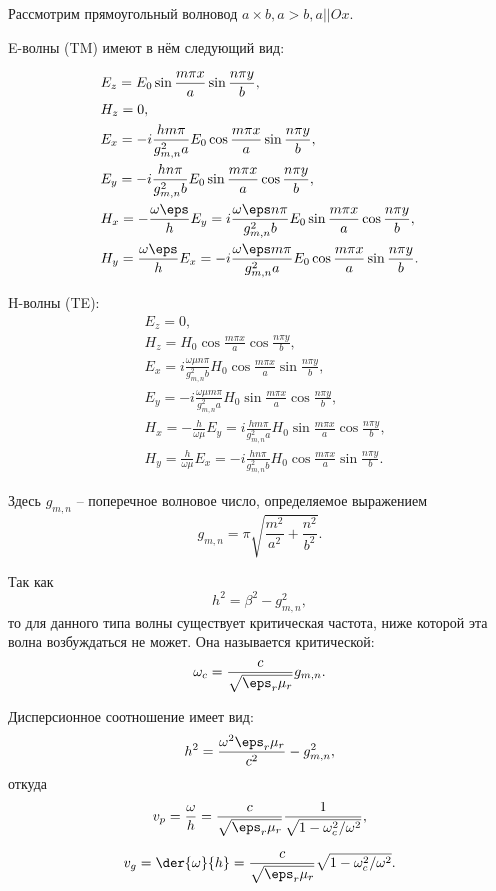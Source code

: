 Рассмотрим прямоугольный волновод \( a \times b, a > b, a || Ox \).

E-волны (TM) имеют в нём следующий вид:

\begin{align*}
	& E_z = E_0\sin\frac{m\pi x}{a}\sin\frac{n\pi y}{b},\\
	& H_z = 0,\\
	& E_x = -i\frac{hm\pi}{g_{m,n}^2a}E_0\cos\frac{m\pi x}{a}\sin\frac{n\pi y}{b},\\
	& E_y = -i\frac{hn\pi}{g_{m,n}^2b}E_0\sin\frac{m\pi x}{a}\cos\frac{n\pi y}{b},\\
	& H_x = -\frac{\omega\eps}{h}E_y = i\frac{\omega\eps n\pi}{g_{m,n}^2b}E_0
	 								\sin\frac{m\pi x}{a}\cos\frac{n\pi y}{b},\\
	& H_y = \frac{\omega\eps}{h}E_x = -i\frac{\omega\eps m\pi}{g_{m,n}^2a}E_0
	 								\cos\frac{m\pi x}{a}\sin\frac{n\pi y}{b}.
\end{align*}

H-волны (TE):
\begin{align*}
	& E_z = 0,\\
	& H_z = H_0\cos\frac{m\pi x}{a}\cos\frac{n\pi y}{b},\\
	& E_x = i\frac{\omega\mu n\pi}{g_{m,n}^2b}H_0\cos\frac{m\pi x}{a}\sin\frac{n\pi y}{b},\\
	& E_y = -i\frac{\omega\mu m\pi}{g_{m,n}^2a}H_0\sin\frac{m\pi x}{a}\cos\frac{n\pi y}{b},\\
	& H_x = -\frac{h}{\omega\mu}E_y = i\frac{hm\pi}{g_{m,n}^2a}H_0
	 								\sin\frac{m\pi x}{a}\cos\frac{n\pi y}{b},\\
	& H_y = \frac{h}{\omega\mu}E_x = -i\frac{h n\pi}{g_{m,n}^2b}H_0
	 								\cos\frac{m\pi x}{a}\sin\frac{n\pi y}{b}.
\end{align*}

Здесь \( g_{m,n} \) -- поперечное волновое число, определяемое выражением
\[
	g_{m,n} = \pi\sqrt{\frac{m^2}{a^2} + \frac{n^2}{b^2}}.
\]

Так как
\[
	h^2 = \beta^2 - g_{m,n}^2,
\]
то для данного типа волны существует критическая частота, ниже которой эта волна возбуждаться не может. Она называется критической:
\[
	\omega_c = \frac{c}{\sqrt{\eps_r \mu_r}}g_{m,n}.
\]

Дисперсионное соотношение имеет вид:
\[
	h^2 = \frac{\omega^2 \eps_r \mu_r}{c^2} - g_{m,n}^2,
\]
откуда
\[
	v_p = \frac{\omega}{h} = \frac{c}{\sqrt{\eps_r\mu_r}}\frac{1}{\sqrt{1 - \omega_c^2 / \omega^2}},
\]

\[
	v_g = \der{\omega}{h} = \frac{c}{\sqrt{\eps_r\mu_r}}\sqrt{1 - \omega_c^2 / \omega^2}.
\]

